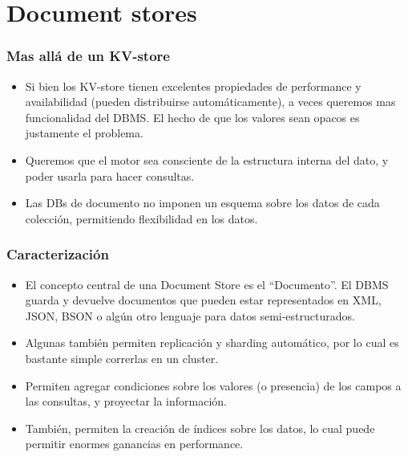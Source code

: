 \section{Document stores}

\begin{frame}
\frametitle{Mas allá de un KV-store}
\begin{itemize}

\item	Si bien los KV-store tienen excelentes propiedades de performance
	y availabilidad (pueden distribuirse automáticamente), a veces
	queremos mas funcionalidad del DBMS. El hecho de que los valores
	sean opacos es justamente el problema.
	\pause

\item	Queremos que el motor sea consciente de la estructura interna
	del dato, y poder usarla para hacer consultas.
	\pause

\item	Las DBs de documento no imponen un esquema sobre los datos de
	cada colección, permitiendo flexibilidad en los datos.
\end{itemize}
\end{frame}

\begin{frame}
\frametitle{Caracterización}
\begin{itemize}
\item	El concepto central de una Document Store es el ``Documento''.
	El DBMS guarda y devuelve documentos que pueden estar representados
	en XML, JSON, BSON o algún otro lenguaje para datos semi-estructurados.
	\pause

\item	Algunas también permiten replicación y sharding automático, por lo
	cual es bastante simple correrlas en un cluster.
	\pause

\item	Permiten agregar condiciones sobre los valores (o presencia) de los
	campos a las consultas, y proyectar la información.
	\pause

\item	También, permiten la creación de índices sobre los datos, lo cual
	puede permitir enormes ganancias en performance.
\end{itemize}
\end{frame}
